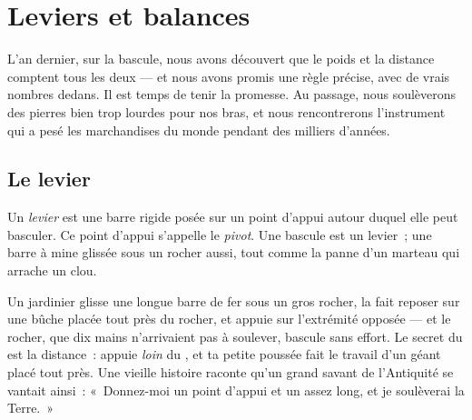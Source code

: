\chapter{Leviers et balances}\label{ch:g3:levers-and-scales}

L'an dernier, sur la bascule, nous avons découvert que le poids et la
distance comptent tous les deux --- et nous avons promis une règle
précise, avec de vrais nombres dedans. Il est temps de tenir la
promesse. Au passage, nous soulèverons des pierres bien trop lourdes
pour nos bras, et nous rencontrerons l'instrument qui a pesé les
marchandises du monde pendant des milliers d'années.

\section{Le levier}

\begin{definition}\label{def:g3:levers-and-scales:lever}
Un \emph{levier} est une barre rigide posée sur un
point d'appui autour duquel elle peut basculer. Ce point d'appui
s'appelle le \emph{pivot}. Une bascule est un levier~;
une barre à mine glissée sous un rocher aussi, tout comme la panne
d'un marteau qui arrache un clou.
\end{definition}

\begin{example}\label{ex:g3:levers-and-scales:crowbar}
Un jardinier glisse une longue barre de fer sous un gros rocher, la
fait reposer sur une bûche placée tout près du rocher, et appuie sur
l'extrémité opposée --- et le rocher, que dix mains n'arrivaient pas
à soulever, bascule sans effort. Le secret du  est la
distance~: appuie \emph{loin} du , et ta petite poussée fait le
travail d'un géant placé tout près. Une vieille histoire raconte
qu'un grand savant de l'Antiquité se vantait ainsi~: «~Donnez-moi un
point d'appui et un  assez long, et je soulèverai la Terre.~»
\end{example}

